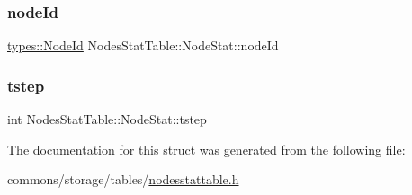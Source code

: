 \subsubsection{\texorpdfstring{nodeId}{nodeId}}
{\footnotesize\ttfamily \mbox{\hyperlink{classtypes_1_1_node_id}{types\+::\+Node\+Id}} Nodes\+Stat\+Table\+::\+Node\+Stat\+::node\+Id}

\mbox{\label{struct_nodes_stat_table_1_1_node_stat_a5a78dbc669fcda8d8ea42075b286c749}} 
\subsubsection{\texorpdfstring{tstep}{tstep}}
{\footnotesize\ttfamily int Nodes\+Stat\+Table\+::\+Node\+Stat\+::tstep}



The documentation for this struct was generated from the following file\+:\begin{DoxyCompactItemize}
\item 
commons/storage/tables/\mbox{\hyperlink{nodesstattable_8h}{nodesstattable.\+h}}\end{DoxyCompactItemize}
